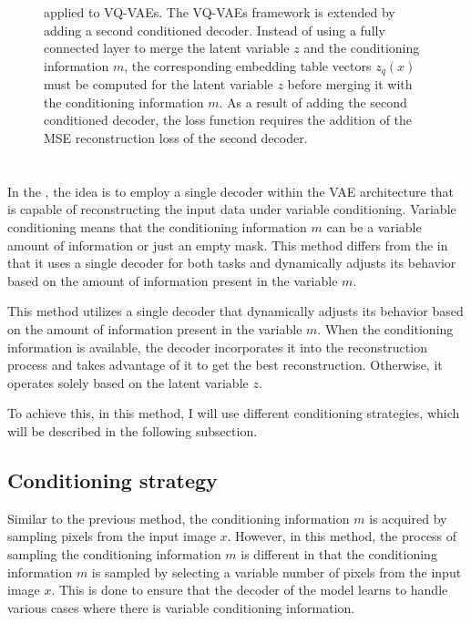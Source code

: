 \begin{figure}[H]
    \centering
    
    \caption[ applied to VQ-VAEs.]%
    {
         applied to VQ-VAEs. The VQ-VAEs framework is extended by adding a second conditioned decoder. Instead of using a fully connected layer to merge the latent variable $z$ and the conditioning information $m$, the corresponding embedding table vectors $z_q(x)$ must be computed for the latent variable $z$ before merging it with the conditioning information $m$. As a result of adding the second conditioned decoder, the loss function requires the addition of the MSE reconstruction loss of the second decoder.
    }\label{SCVQVAE2DFigure}
\end{figure}

\section{}

In the , the idea is to employ a single decoder within the VAE architecture that is capable of reconstructing the input data under variable conditioning. Variable conditioning means that the conditioning information $m$ can be a variable amount of information or just an empty mask. This method differs from the  in that it uses a single decoder for both tasks and dynamically adjusts its behavior based on the amount of information present in the variable $m$.

This method utilizes a single decoder that dynamically adjusts its behavior
based on the amount of information present in the variable $m$. When the
conditioning information is available, the decoder incorporates it into the
reconstruction process and takes advantage of it to get the best
reconstruction. Otherwise, it operates solely based on the latent variable $z$.

To achieve this, in this method, I will use different conditioning strategies, which will be described in the following subsection.

\subsection{Conditioning strategy}

Similar to the previous method, the conditioning information $m$ is acquired by
sampling pixels from the input image $x$. However, in this method, the process of sampling the conditioning information $m$ is different in that the conditioning information $m$ is sampled by selecting a variable number of pixels from the input image $x$. This is done to ensure that the decoder of the model learns to handle various cases where there is variable conditioning information.

